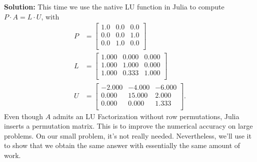 \documentclass[letterpaper]{book}
\begin{document}
\textbf{Solution:} This time we use the native LU function in Julia to compute $P \cdot A = L \cdot U$, with
\begin{equation}
    \label{eq:Chap5pt4LUwithPerm}
    \begin{aligned}
        P&= \left[
\begin{array}{ccc}
1.0 & 0.0 & 0.0 \\
0.0 & 0.0 & 1.0 \\
0.0 & 1.0 & 0.0 \\
\end{array}
\right]\\
L&= \left[ \begin{array}{ccc}
1.000 & 0.000 & 0.000 \\
1.000 & 1.000 & 0.000 \\
1.000 & 0.333 & 1.000 \\
\end{array}
\right]\\
U&= 
\left[
\begin{array}{rrr}
-2.000 & -4.000 & -6.000 \\
0.000 & 15.000 & 2.000 \\
0.000 & 0.000 & 1.333 \\
\end{array}
\right].
 \end{aligned}
\end{equation}
Even though $A$ admits an LU Factorization without row permutations, Julia inserts a permutation matrix. This is to improve the numerical accuracy on large problems. On our small problem, it's not really needed. Nevertheless, we'll use it to show that we obtain the same answer with essentially the same amount of work.\\
\end{document}
